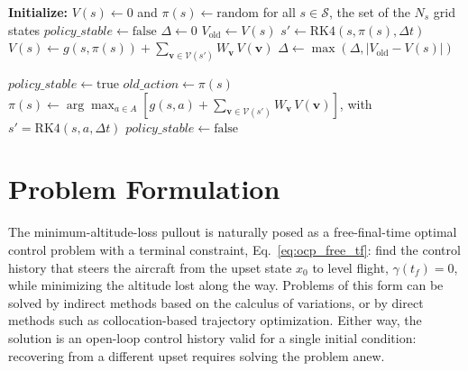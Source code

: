 \documentclass[journal ]{new-aiaa}
\begin{document}
\begin{algorithm}[H]
\caption{Massively Parallel Policy Iteration for High-Fidelity Grids}
\label{alg:parallel-policy-iteration}
\begin{algorithmic}[1]
\STATE \textbf{Initialize:} $V(s) \leftarrow 0$ and $\pi(s) \leftarrow \text{random}$ for all $s \in \mathcal{S}$, the set of the $N_s$ grid states
\STATE $policy\_stable \leftarrow \text{false}$
    \STATE {}
    \REPEAT
        \STATE $\Delta \leftarrow 0$
            \STATE $V_{\text{old}} \leftarrow V(s)$
            \STATE $s' \leftarrow \text{RK4}(s, \pi(s), \Delta t)$
            \STATE $V(s) \leftarrow g(s, \pi(s)) + \sum_{\mathbf{v} \in \mathcal{V}(s')} W_{\mathbf{v}}\, V(\mathbf{v})$ 
            \STATE $\Delta \leftarrow \max(\Delta, |V_{\text{old}} - V(s)|)$
        \ENDFOR

    \STATE {}
    \STATE $policy\_stable \leftarrow \text{true}$
        \STATE $old\_action \leftarrow \pi(s)$
        \STATE $\pi(s) \leftarrow \arg\max_{a \in A} \left[ g(s, a) + \sum_{\mathbf{v} \in \mathcal{V}(s')} W_{\mathbf{v}}\, V(\mathbf{v}) \right]$, with $s' = \text{RK4}(s, a, \Delta t)$
            \STATE $policy\_stable \leftarrow \text{false}$
        \ENDIF
    \ENDFOR
\ENDWHILE
\end{algorithmic}
\end{algorithm}

\section{Problem Formulation}

The minimum-altitude-loss pullout is naturally posed as a free-final-time
optimal control problem with a terminal constraint,
Eq.~\eqref{eq:ocp_free_tf}: find the control history that steers the
aircraft from the upset state $x_0$ to level flight,
$\gamma(t_f) = 0$, while minimizing the altitude lost along the way.
Problems of this form can be solved by indirect methods based on the
calculus of variations, or by direct methods such as collocation-based
trajectory optimization. Either way, the solution is an open-loop control
history valid for a single initial condition: recovering from a different
upset requires solving the problem anew.
\end{document}
